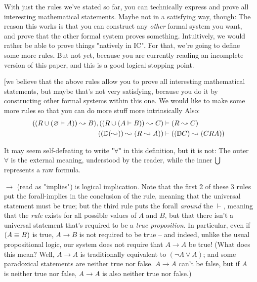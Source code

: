 \documentclass{article}
\begin{document}
  With just the rules we've stated so far, you can technically express and prove all interesting mathematical statements. Maybe not in a satisfying way, though: The reason this works is that you can construct any \emph{other} formal system you want, and prove that the other formal system proves something. Intuitively, we would rather be able to prove things "natively in IC". For that, we're going to define some more rules. But not yet, because you are currently reading an incomplete version of this paper, and this is a good logical stopping point.
  
  \iffalse
  
  [we believe that the above rules allow you to prove all interesting mathematical statements, but maybe that's not very satisfying, because you do it by constructing other formal systems within this one. We would like to make some more rules so that you can do more stuff more intrinsically
  Also:
  \begin{align*}
    ((R \cup (\varnothing \vdash A)) \leadsto B), ((R \cup (A \vdash B)) \leadsto C) &\vdash (R \leadsto C) \\
    ((\mathbb{D} (\leadsto)) \leadsto (R \leadsto A)) &\vdash ((\mathbb{D} C) \leadsto (C R A)) \\
  \end{align*}
  

  It may seem self-defeating to write "$\forall$" in this definition, but it is not: The outer $\forall$ is the external meaning, understood by the reader, while the inner $\bigcup$ represents a raw formula.
  
  
    
  $\to$ (read as "implies") is logical implication. Note that the first 2 of these 3 rules put the forall-implies in the conclusion of the rule, meaning that the universal statement must be true; but the third rule puts the forall \emph{around} the $\vdash$, meaning that the \emph{rule} exists for all possible values of $A$ and $B$, but that there isn't a universal statement that's required to be a \emph{true proposition}. In particular, even if $(A \equiv B)$ is true, $A \to B$ is not required to be true – and indeed, unlike the usual propositional logic, our system does not require that $A \to A$ be true! (What does this mean? Well, $A \to A$ is traditionally equivalent to $(\neg A \vee A)$; and some paradoxical statements are neither true nor false. $A \to A$ can't be false, but if $A$ is neither true nor false, $A \to A$ is also neither true nor false.)
  
\end{document}
